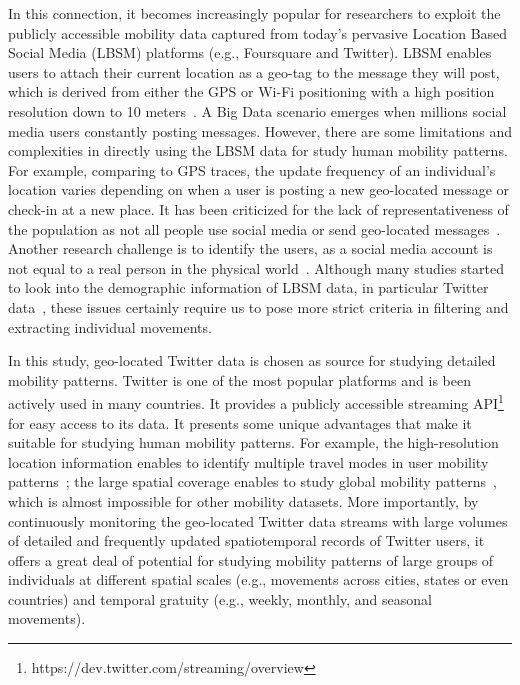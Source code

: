 \documentclass[]{tGIS2e}
\begin{document}
{In this connection, it becomes increasingly popular for researchers to exploit the publicly accessible mobility data captured from today's pervasive Location Based Social Media (LBSM) platforms (e.g., Foursquare and Twitter). 
LBSM enables users to attach their current location as a geo-tag to the message they will post, which is derived from either the GPS or Wi-Fi positioning with a high position resolution down to 10 meters~\citep{Jurdak2015}.
A Big Data scenario emerges when millions social media users constantly posting messages.
However, there are some limitations and complexities in directly using the LBSM data for study human mobility patterns. 
For example, comparing to GPS traces, the update frequency of an individual's location varies depending on when a user is posting a new geo-located message or check-in at a new place. It has been criticized for the lack of representativeness of the population as not all people use social media or send geo-located messages~\citep{kung2014exploring}. Another research challenge is to identify the users, as a social media account is not equal to a real person in the physical world~\citep{tsou2015}.
Although many studies started to look into the demographic information of LBSM data, in particular Twitter data~\citep{mitchell2013geography,longley2015geotemporal}, these issues certainly require us to pose more strict criteria in filtering and extracting individual movements.

In this study, geo-located Twitter data is chosen as source for studying detailed mobility patterns. Twitter is one of the most popular platforms and is been actively used in many countries. It provides a publicly accessible streaming API\footnote{https://dev.twitter.com/streaming/overview} for easy access to its data.
It presents some unique advantages that make it suitable for studying human mobility patterns.
For example, the high-resolution location information enables to identify multiple travel modes in user mobility patterns~\citep{Jurdak2015}; the large spatial coverage enables to study global mobility patterns~\citep{hawelka2014geo}, which is almost impossible for other mobility datasets.
More importantly, by continuously monitoring the geo-located Twitter data streams with large volumes of detailed and frequently updated spatiotemporal  records of Twitter users, it offers a great deal of potential for studying mobility patterns of large groups of individuals at different spatial scales (e.g., movements across cities, states or even countries) and temporal gratuity (e.g., weekly, monthly, and seasonal movements).

}
\end{document}
